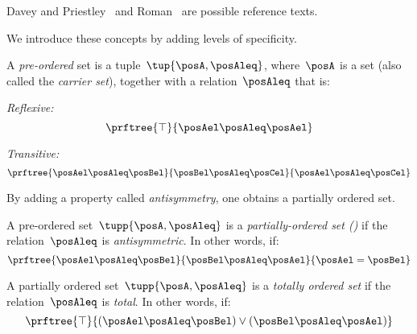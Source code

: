 Davey and Priestley~\cite{davey02}
and Roman~\cite{roman08} are possible reference texts.

We introduce these concepts by adding levels of specificity.

\begin{definition}
\label{def:preorder}
    A \emph{pre-ordered} set is a tuple~$\tup{\posA,\posAleq}$, where~$\posA$ is a set (also called the \emph{carrier set}), together with a relation~$\posAleq$ that is:
    \begin{compactitem}
        \item \emph{Reflexive:}
        \begin{equation}
            \prftree{\top}{\posAel \posAleq \posAel}
        \end{equation}
        \item \emph{Transitive:}
        \begin{equation}
            \prftree{\posAel \posAleq \posBel}{\posBel \posAleq \posCel}{\posAel \posAleq \posCel}
        \end{equation}
    \end{compactitem}
\end{definition}
By adding a property called \emph{antisymmetry}, one obtains a partially ordered set.
\begin{definition}
  \label{def:poset}
  A pre-ordered set~$\tupp{\posA,\posAleq}$ is a \emph{partially-ordered set ()} if the relation~$\posAleq$ is \emph{antisymmetric}. In other words, if:
      \begin{equation}
          \prftree{\posAel \posAleq \posBel}{\posBel \posAleq \posAel}{\posAel = \posBel}
    \end{equation}
\end{definition}

\begin{definition}
    \label{def:total_order}
    A partially ordered set~$\tupp{\posA,\posAleq}$ is a \emph{totally ordered set} if the relation~$\posAleq$ is \emph{total}. In other words, if:
    \begin{equation}
        \prftree{\top}{(\posAel \posAleq \posBel) \vee (\posBel \posAleq \posAel)}
    \end{equation}
\end{definition}


